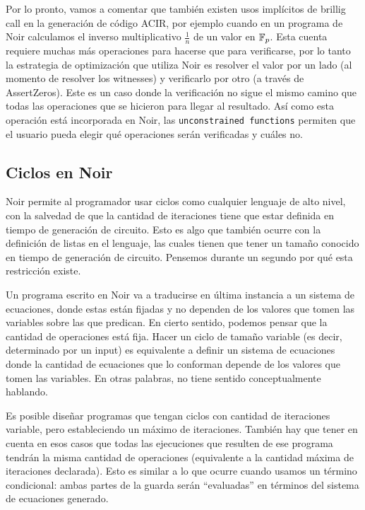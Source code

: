 Por lo pronto, vamos a comentar que también existen usos implícitos de brillig call en la generación de código ACIR, por ejemplo cuando en un programa de Noir calculamos el inverso multiplicativo $\frac{1}{n}$ de un valor en $\mathbb{F}_p$. Esta cuenta requiere muchas más operaciones para hacerse que para verificarse, por lo tanto la estrategia de optimización que utiliza Noir es resolver el valor por un lado (al momento de resolver los witnesses) y verificarlo por otro (a través de AssertZeros). Este es un caso donde la verificación no sigue el mismo camino que todas las operaciones que se hicieron para llegar al resultado. Así como esta operación está incorporada en Noir, las \texttt{unconstrained functions} permiten que el usuario pueda elegir qué operaciones serán verificadas y cuáles no. 

\subsection{Ciclos en Noir}\label{sec:noir_loops}
Noir permite al programador usar ciclos como cualquier lenguaje de alto nivel, con la salvedad de que la cantidad de iteraciones tiene que estar definida en tiempo de generación de circuito. Esto es algo que también ocurre con la definición de listas en el lenguaje, las cuales tienen que tener un tamaño conocido en tiempo de generación de circuito. Pensemos durante un segundo por qué esta restricción existe. 

Un programa escrito en Noir va a traducirse en última instancia a un sistema de ecuaciones, donde estas están fijadas y no dependen de los valores que tomen las variables sobre las que predican. En cierto sentido, podemos pensar que la cantidad de operaciones está fija. Hacer un ciclo de tamaño variable (es decir, determinado por un input) es equivalente a definir un sistema de ecuaciones donde la cantidad de ecuaciones que lo conforman depende de los valores que tomen las variables. En otras palabras, no tiene sentido conceptualmente hablando.

Es posible diseñar programas que tengan ciclos con cantidad de iteraciones variable, pero estableciendo un máximo de iteraciones. También hay que tener en cuenta en esos casos que todas las ejecuciones que resulten de ese programa tendrán la misma cantidad de operaciones (equivalente a la cantidad máxima de iteraciones declarada). Esto es similar a lo que ocurre cuando usamos un término condicional: ambas partes de la guarda serán “evaluadas'' en términos del sistema de ecuaciones generado. 

